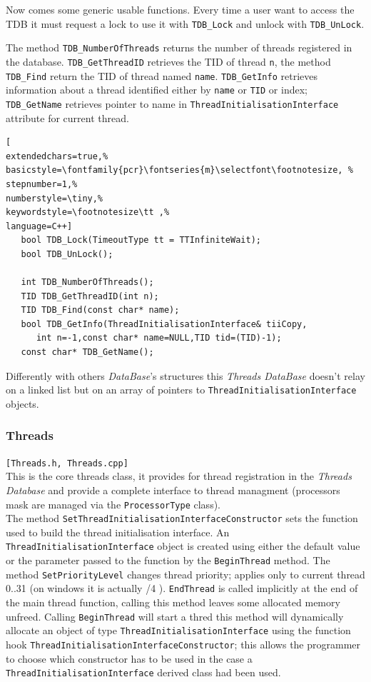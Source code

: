 Now comes some generic usable functions. Every time a user want to access the TDB it must request a lock to use it with \texttt{TDB\_Lock} and unlock with \texttt{TDB\_UnLock}.

The method \texttt{TDB\_NumberOfThreads} returns the number of threads registered in the database. \texttt{TDB\_GetThreadID} retrieves the TID of thread \texttt{n}, the method \texttt{TDB\_Find} return the TID of thread named \texttt{name}.
\texttt{TDB\_GetInfo} retrieves information about a thread identified either by \texttt{name} or \texttt{TID} or index; \texttt{TDB\_GetName} retrieves pointer to name in \texttt{ThreadInitialisationInterface} attribute for current thread.

\begin{lstlisting}[
extendedchars=true,%
basicstyle=\fontfamily{pcr}\fontseries{m}\selectfont\footnotesize, %
stepnumber=1,%
numberstyle=\tiny,%
keywordstyle=\footnotesize\tt ,%
language=C++]
   bool TDB_Lock(TimeoutType tt = TTInfiniteWait);
   bool TDB_UnLock();

   int TDB_NumberOfThreads();
   TID TDB_GetThreadID(int n);
   TID TDB_Find(const char* name);
   bool TDB_GetInfo(ThreadInitialisationInterface& tiiCopy,
      int n=-1,const char* name=NULL,TID tid=(TID)-1);
   const char* TDB_GetName();
\end{lstlisting}

Differently with others \textit{DataBase}'s structures this \textit{Threads DataBase} doesn't relay on a linked list but on an array of pointers to \texttt{ThreadInitialisationInterface} objects.



\subsubsection{Threads}
\texttt{[Threads.h, Threads.cpp]}\\

This is the core threads class, it provides for thread registration in the \textit{Threads Database} and provide a complete interface to thread managment (processors mask are managed via the \texttt{ProcessorType} class).\\


The method \texttt{SetThreadInitialisationInterfaceConstructor} sets the function used to build the thread initialisation interface. An \texttt{ThreadInitialisationInterface} object is created using either the default value or the parameter passed to the function by the \texttt{BeginThread} method. The method \texttt{SetPriorityLevel} changes thread priority; applies only to current thread 0..31 (on windows it is actually /4 ). \texttt{EndThread} is called implicitly at the end of the main thread function, calling this method leaves some allocated memory unfreed. Calling \texttt{BeginThread} will start a thred this method will dynamically allocate an object of type \texttt{ThreadInitialisationInterface} using the function hook \texttt{ThreadInitialisationInterfaceConstructor}; this allows the programmer to choose which constructor has to be used in the case a \texttt{ThreadInitialisationInterface} derived class had been used.

